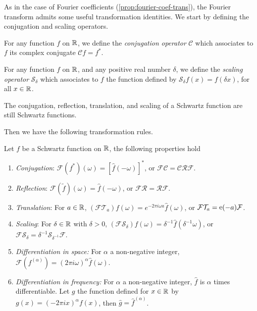 As in the case of Fourier coefficients (\cref{prop:fourier-coef-trans}), the Fourier
transform admits some useful transformation identities. We start by defining the
conjugation and scaling operators.
\begin{definition}
  For any function $f$ on $\mathbb{R}$, we define the \emph{conjugation operator} $\mathcal{C}$
  which associates to $f$ its complex conjugate $\mathcal{C}f=f^*$.
\end{definition}
\begin{definition}
  For any function $f$ on $\mathbb{R}$, and any positive real number $\delta$, we define the
  \emph{scaling operator} $\mathcal{S}_{\delta}$ which associates to $f$ the function
  defined by $\mathcal{S}_{\delta}f(x)=f(\delta x)$, for all $x\in\mathbb{R}$.
\end{definition}
\begin{proposition}
  The conjugation, reflection, translation, and scaling of a Schwartz function are still
  Schwartz functions.
\end{proposition}
Then we have the following transformation rules.
\begin{proposition}
  \label{prop:ft-trans}
  Let $f$ be a Schwartz function on $\mathbb{R}$, the following properties hold
  \begin{enumerate}
    \item \emph{Conjugation}: $\mathcal{F}(f^*)(\omega)=[\hat{f}(-\omega)]^*$, or
      $\mathcal{F}\mathcal{C}=\mathcal{C}\mathcal{R}\mathcal{F}$.
    \item \emph{Reflection}: $\mathcal{F}(\tilde{f})(\omega)=\hat{f}(-\omega)$, or
      $\mathcal{F}\mathcal{R}=\mathcal{R}\mathcal{F}$.
    \item \emph{Translation}: For $a\in\mathbb{R}$, $(\mathcal{F}\mathcal{T}_{a})f(\omega)
      =e^{-2\pi i\omega a}\hat{f}(\omega)$, or
      $\mathcal{F}\mathcal{T}_{a}=\operatorname{e}(-a)\mathcal{F}$.
    \item \emph{Scaling}: For $\delta\in\mathbb{R}$ with $\delta>0$,
      $(\mathcal{F}\mathcal{S}_{\delta})f(\omega)=\delta^{-1}\hat{f}(\delta^{-1}\omega)$,
      or
      $\mathcal{F}\mathcal{S}_{\delta}=\delta^{-1}\mathcal{S}_{\delta^{-1}}\mathcal{F}$.
    \item \emph{Differentiation in space:} For $\alpha$ a non-negative integer,
      $\mathcal{F}(f^{(\alpha )})=(2\pi i\omega)^{\alpha}\hat{f}(\omega)$.
    \item \emph{Differentiation in frequency:} For $\alpha$ a non-negative integer,
      $\hat{f}$ is $\alpha$ times differentiable. Let $g$ the function defined for
      $x\in\mathbb{R}$ by $g(x)=(-2\pi ix)^\alpha f(x)$, then $\hat{g}=\hat{f}^{(\alpha)}$.
  \end{enumerate}
\end{proposition}
